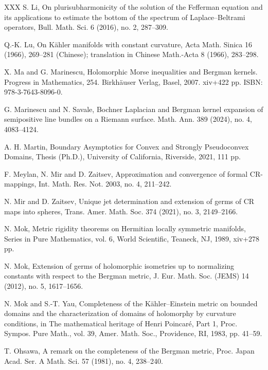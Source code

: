 \documentclass[a4paper,centertags,oneside,12pt]{amsart}
\numberwithin{equation}{section}
\begin{document}
\begin{thebibliography}{XXX}
 S. Li, On plurisubharmonicity of the solution of the Fefferman equation and its applications to estimate the bottom of the spectrum of Laplace--Beltrami operators, Bull. Math. Sci. 6 (2016), no. 2, 287--309.

 Q.-K. Lu, On K\"ahler manifolds with constant curvature, Acta Math. Sinica 16 (1966), 269--281 (Chinese); translation in Chinese Math.-Acta 8 (1966), 283--298.

 X. Ma and G. Marinescu, Holomorphic Morse inequalities and Bergman kernels. Progress in Mathematics, 254. Birkhäuser Verlag, Basel, 2007. xiv+422 pp. ISBN: 978-3-7643-8096-0.

 G. Marinescu and N. Savale, Bochner Laplacian and Bergman kernel expansion of semipositive line bundles on a Riemann surface. Math. Ann. 389 (2024), no. 4, 4083--4124.

 A. H. Martin, Boundary Asymptotics for Convex and Strongly Pseudoconvex Domains, Thesis (Ph.D.), University of California, Riverside, 2021, 111 pp.




 F. Meylan, N. Mir and D. Zaitsev, Approximation and convergence of formal CR-mappings, Int. Math. Res. Not. 2003, no. 4, 211--242.

 N. Mir and D. Zaitsev, Unique jet determination and extension of germs of CR maps into spheres, Trans. Amer. Math. Soc. 374 (2021), no. 3, 2149--2166.

 N. Mok, Metric rigidity theorems on Hermitian locally symmetric manifolds, Series in Pure Mathematics, vol. 6, World Scientific, Teaneck, NJ, 1989, xiv+278 pp.

 N. Mok, Extension of germs of holomorphic isometries up to normalizing constants with respect to the Bergman metric, J. Eur. Math. Soc. (JEMS) 14 (2012), no. 5, 1617--1656.

 N. Mok and S.-T. Yau, Completeness of the K\"ahler--Einstein metric on bounded domains and the characterization of domains of holomorphy by curvature conditions, in The mathematical heritage of Henri Poincar\'e, Part 1, Proc. Sympos. Pure Math., vol. 39, Amer. Math. Soc., Providence, RI, 1983, pp. 41--59.

 T. Ohsawa, A remark on the completeness of the Bergman metric, Proc. Japan Acad. Ser. A Math. Sci. 57 (1981), no. 4, 238--240.


\end{thebibliography}
\end{document}
